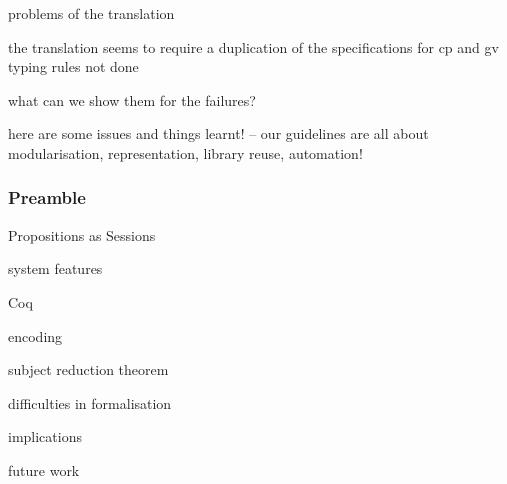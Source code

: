 \documentclass{beamer}
\begin{document}
\begin{frame}
problems of the translation
\end{frame}

the translation seems to require a duplication of the specifications for cp
and gv typing rules not done

what can we show them for the failures?

here are some issues and things learnt! -- our guidelines are all about
modularisation, representation, library reuse, automation!

\begin{frame}
\frametitle{Preamble}
\item Propositions as Sessions
\item system features
\item Coq
\item encoding
\item subject reduction theorem
\item difficulties in formalisation
\item implications
\item future work
\end{frame}

\printbibliography
\end{document}
